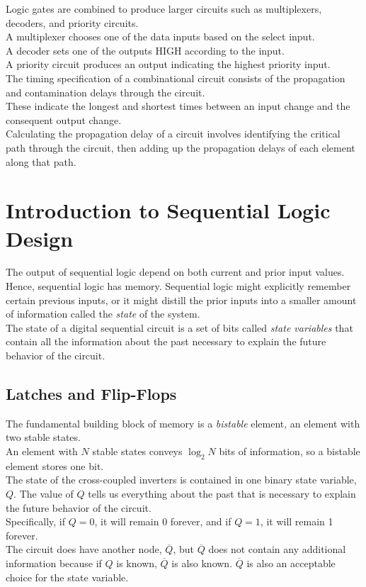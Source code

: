 \documentclass[12pt]{article}
\theoremstyle{definition}
\begin{document}
  Logic gates are combined to produce larger circuits such as multiplexers, decoders, and priority circuits. \\
  A multiplexer chooses one of the data inputs based on the select input. \\
  A decoder sets one of the outputs HIGH according to the input. \\
  A priority circuit produces an output indicating the highest priority input. \\

  The timing specification of a combinational circuit consists of the propagation and contamination delays through the circuit. \\
  These indicate the longest and shortest times between an input change and the consequent output change. \\
  Calculating the propagation delay of a circuit involves identifying the critical path through the circuit, then adding up the propagation delays of each element along that path.

  \newpage
  \section{Introduction to Sequential Logic Design}
  The output of sequential logic depend on both current and prior input values. \\
  Hence, sequential logic has memory.
  Sequential logic might explicitly remember certain previous inputs, or it might distill the prior inputs into a smaller amount of information called the \emph {state} of the system. \\
  The state of a digital sequential circuit is a set of bits called \emph{state variables} that contain all the information about the past necessary to explain the future behavior of the circuit.

  \subsection{Latches and Flip-Flops}
  The fundamental building block of memory is a \emph{bistable} element, an element with two stable states. \\
  An element with $N$ stable states conveys $\log_{2}N$ bits of information, so a bistable element stores one bit. \\
  The state of the cross-coupled inverters is contained in one binary state variable, $Q$.
  The value of $Q$ tells us everything about the past that is necessary to explain the future behavior of the circuit. \\
  Specifically, if $Q = 0$, it will remain 0 forever, and if $Q = 1$, it will remain 1 forever. \\
  The circuit does have another node, $\overline{Q}$, but $\overline{Q}$ does not contain any additional information because if $Q$ is known, $\overline{Q}$ is also known.
  $\overline{Q}$ is also an acceptable choice for the state variable. \\
\end{document}
